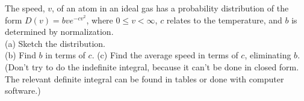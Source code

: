 The speed, $v$, of an atom in an ideal gas has a probability
distribution of the form
$D(v) = bve^{-cv^2}$,
where $0\le v < \infty$,
$c$ relates to the temperature, and $b$ is determined
by normalization.\\
(a) Sketch the distribution.\\
(b) Find $b$ in terms of $c$.\answercheck\hwendpart
(c) Find the average speed in terms of $c$, eliminating
$b$. (Don't try to do the indefinite
integral, because it can't be done in closed form. The
relevant definite integral can be found in tables or done
with computer software.)\answercheck

